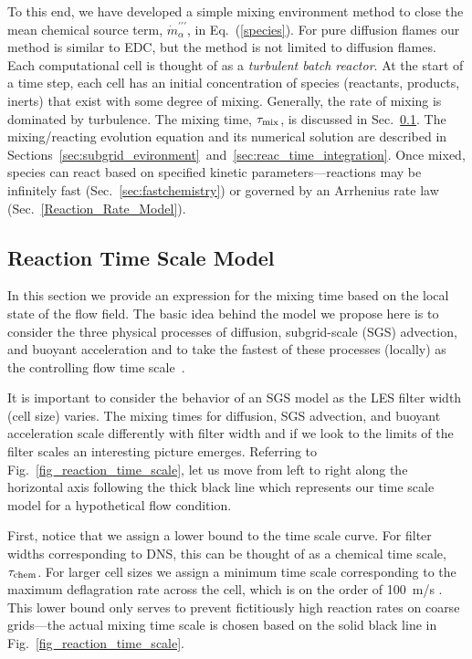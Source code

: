 To this end, we have developed a simple mixing environment method to close the mean chemical source term, $\dot{m}^{\prime\prime\prime}_{\alpha}$, in Eq.~(\ref{species}).  For pure diffusion flames our method is similar to EDC, but the method is not limited to diffusion flames.  Each computational cell is thought of as a {\em turbulent batch reactor}. At the start of a time step, each cell has an initial concentration of species (reactants, products, inerts) that exist with some degree of mixing. Generally, the rate of mixing is dominated by turbulence. The mixing time, $\tau_{\rm mix}$, is discussed in Sec.~\ref{sec:reac_time_scale}. The mixing/reacting evolution equation and its numerical solution are described in Sections~\ref{sec:subgrid_evironment}~and~\ref{sec:reac_time_integration}. Once mixed, species can react based on specified kinetic parameters---reactions may be infinitely fast (Sec.~\ref{sec:fastchemistry}) or governed by an Arrhenius rate law (Sec.~\ref{Reaction_Rate_Model}).


\subsection{Reaction Time Scale Model}
\label{sec:reac_time_scale}

In this section we provide an expression for the mixing time based on the local state of the flow field.  The basic idea behind the model we propose here is to consider the three physical processes of diffusion, subgrid-scale (SGS) advection, and buoyant acceleration and to take the fastest of these processes (locally) as the controlling flow time scale~\cite{McDermott:2011}.

It is important to consider the behavior of an SGS model as the LES filter width (cell size) varies. The mixing times for diffusion, SGS advection, and buoyant acceleration scale differently with filter width and if we look to the limits of the filter scales an interesting picture emerges.  Referring to Fig.~\ref{fig_reaction_time_scale}, let us move from left to right along the horizontal axis following the thick black line which represents our time scale model for a hypothetical flow condition.

First, notice that we assign a lower bound to the time scale curve. For filter widths corresponding to DNS, this can be thought of as a chemical time scale, $\tau_{\rm chem}$. For larger cell sizes we assign a minimum time scale corresponding to the maximum deflagration rate across the cell, which is on the order of 100~m/s \cite{Chin:2023}. This lower bound only serves to prevent fictitiously high reaction rates on coarse grids---the actual mixing time scale is chosen based on the solid black line in Fig.~\ref{fig_reaction_time_scale}.

